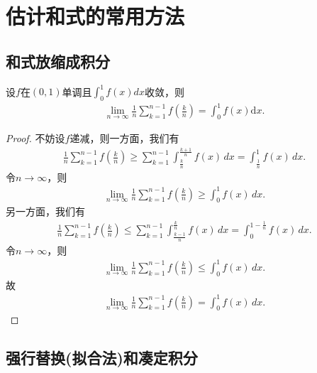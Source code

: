 \documentclass[../../main.tex]{subfiles}
\begin{document}
\section{估计和式的常用方法}

\subsection{和式放缩成积分}

\begin{proposition}
设\(f\)在\((0,1)\)单调且\(\int_{0}^{1} f(x)dx\)收敛，则
\begin{align*}
\lim_{n \to \infty} \frac{1}{n} \sum_{k = 1}^{n - 1} f\left(\frac{k}{n}\right) = \int_{0}^{1} f(x)\mathrm{d}x.
\end{align*}
\end{proposition}
\begin{proof}
不妨设\(f\)递减，则一方面，我们有
\begin{align*}
\frac{1}{n}\sum_{k=1}^{n-1}f\left(\frac{k}{n}\right) \geqslant \sum_{k=1}^{n-1}\int_{\frac{k}{n}}^{\frac{k+1}{n}}f(x) \, dx = \int_{\frac{1}{n}}^1 f(x) \, dx.
\end{align*}
令\(n \to \infty\)，则
\begin{align*}
\lim_{n \to \infty} \frac{1}{n}\sum_{k=1}^{n-1}f\left(\frac{k}{n}\right) \geqslant \int_0^1 f(x) \, dx.
\end{align*}
另一方面，我们有
\begin{align*}
\frac{1}{n}\sum_{k=1}^{n-1}f\left(\frac{k}{n}\right) \leqslant \sum_{k=1}^{n-1}\int_{\frac{k-1}{n}}^{\frac{k}{n}}f(x) \, dx = \int_{0}^{1-\frac{1}{n}} f(x) \, dx.
\end{align*}
令\(n \to \infty\)，则
\begin{align*}
\lim_{n \to \infty} \frac{1}{n}\sum_{k=1}^{n-1}f\left(\frac{k}{n}\right) \leqslant \int_0^1 f(x) \, dx.
\end{align*}
故
\begin{align*}
\lim_{n \to \infty} \frac{1}{n}\sum_{k=1}^{n-1}f\left(\frac{k}{n}\right) = \int_0^1 f(x) \, dx.
\end{align*}
\end{proof}

\subsection{强行替换(拟合法)和凑定积分}\label{强行替换(拟合法)和凑定积分}
\end{document}
